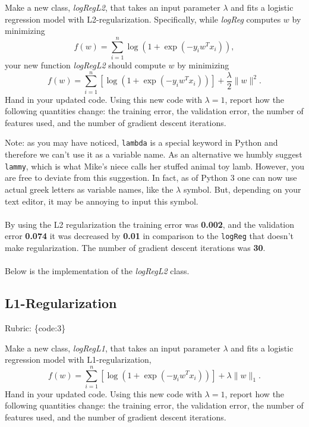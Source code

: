 \documentclass{article}
\def\rubric#1{\gre{Rubric: \{#1\}}}{}
\def\blu#1{{\color{blu}#1}}
\def\gre#1{{\color{gre}#1}}
\def\norm#1{\|#1\|}
\def\ans#1{{\color{ans}#1}}
\begin{document}
Make a new class, \emph{logRegL2}, that takes an input parameter $\lambda$ and fits a logistic regression model with L2-regularization. Specifically, while \emph{logReg} computes $w$ by minimizing
\[
f(w) = \sum_{i=1}^n \log(1+\exp(-y_iw^Tx_i)),
\]
your new function \emph{logRegL2} should compute $w$ by minimizing
\[
f(w) = \sum_{i=1}^n \left[\log(1+\exp(-y_iw^Tx_i))\right] + \frac{\lambda}{2}\norm{w}^2.
\]
\blu{Hand in your updated code. Using this new code with $\lambda = 1$, report how the following quantities change: the training error, the validation error, the number of features used, and the number of gradient descent iterations.}

Note: as you may have noticed, \texttt{lambda} is a special keyword in Python and therefore we can't use it as a variable name.
As an alternative we humbly suggest \texttt{lammy}, which is what Mike's niece calls her stuffed animal toy lamb.
However, you are free to deviate from this suggestion. In fact, as of Python 3 one can now use actual greek letters as variable names, like the $\lambda$ symbol. But, depending on your text editor, it may be annoying to input this symbol. \\ \\
\ans{
    By using the L2 regularization the training error was \textbf{0.002}, and the validation 
    error \textbf{0.074} it was decreased by \textbf{0.01} in comparison to the \texttt{logReg} that doesn't 
    make regularization. The number of gradient descent iterations was \textbf{30}. \\ \\
    Below is the implementation of the \emph{logRegL2} class.
}
\begin{center}
     
\end{center}

\subsection{L1-Regularization}
\rubric{code:3}

Make a new class, \emph{logRegL1}, that takes an input parameter $\lambda$ and fits a logistic regression model with L1-regularization,
\[
f(w) = \sum_{i=1}^n \left[\log(1+\exp(-y_iw^Tx_i))\right] + \lambda\norm{w}_1.
\]
\blu{Hand in your updated code. Using this new code with $\lambda = 1$, report how the following quantities change: the training error, the validation error, the number of features used, and the number of gradient descent iterations.}
\end{document}
